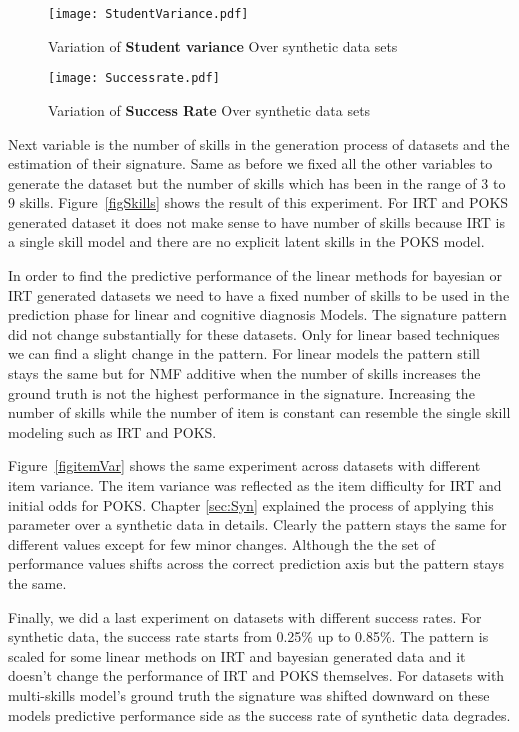 \begin{figure}
  \centering
    \texttt{[image: StudentVariance.pdf]}
\caption{Variation of \textbf{Student variance} Over synthetic data sets}
\label{figStudentVar}
\end{figure}


\begin{figure}
  \centering
    \texttt{[image: Successrate.pdf]}
\caption{Variation of \textbf{Success Rate} Over synthetic data sets}
\label{figSucceessRate}
\end{figure}


Next variable is the number of skills in the generation process of datasets and the estimation of their signature. Same as before we fixed all the other variables to generate the dataset but the number of skills which has been in the range of 3 to 9 skills. Figure~\ref{figSkills} shows the result of this experiment. For IRT and POKS generated dataset it does not make sense to have number of skills because IRT is a single skill model and there are no explicit latent skills in the POKS model. 

In order to find the predictive performance of the linear methods for bayesian or IRT generated datasets we need to have a fixed number of skills to be used in the prediction phase for linear and cognitive diagnosis Models. The signature pattern did not change substantially for these datasets. Only for linear based techniques we can find a slight change in the pattern. For linear models the pattern still stays the same but for NMF additive when the number of skills increases the ground truth is not the highest performance in the signature. Increasing the number of skills while the number of item is constant can resemble the single skill modeling such as IRT and POKS. 

Figure~\ref{figitemVar} shows the same experiment across datasets with different item variance. The item variance was reflected as the item difficulty for IRT and initial odds for POKS. Chapter \ref{sec:Syn} explained the process of applying this parameter over a synthetic data in details. Clearly the pattern stays the same for different values except for few minor changes. Although the the set of performance values shifts across the correct prediction axis but the pattern stays the same.

Finally, we did a last experiment on datasets with different success rates. For synthetic data, the success rate starts from 0.25\% up to 0.85\%. The pattern is scaled for some linear methods on IRT and bayesian generated data and it doesn't change the performance of IRT and POKS themselves. For datasets with multi-skills model's ground truth the signature was shifted downward on these models predictive performance side as the success rate of synthetic data degrades.





